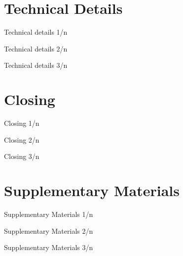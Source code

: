 \section{Technical Details}
\begin{frame}{Technical details 1/n}
\blindmathpaper
\end{frame}

\begin{frame}{Technical details 2/n}
\blindmathpaper
\end{frame}

\begin{frame}{Technical details 3/n}
\blindmathpaper
\end{frame}

\section{Closing}
\begin{frame}{Closing 1/n}
\blindtext    
\end{frame}

\begin{frame}{Closing 2/n}
\blindtext    
\end{frame}

\begin{frame}{Closing 3/n}
\blindtext    
\end{frame}

\section{Supplementary Materials}
\begin{frame}{Supplementary Materials 1/n}
\blindmathpaper
\end{frame}

\begin{frame}{Supplementary Materials 2/n}
\blindmathpaper
\end{frame}

\begin{frame}{Supplementary Materials 3/n}
\blindmathpaper
\end{frame}